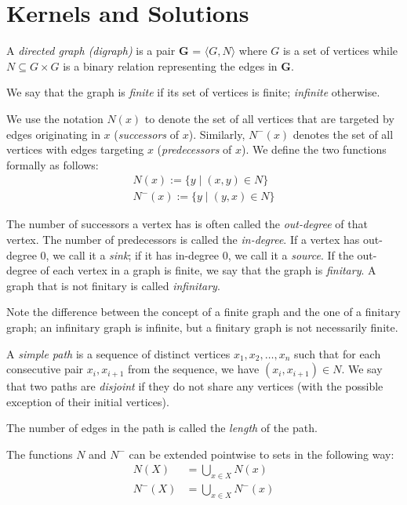 \section{Kernels and Solutions}
\label{sec:Graphs, Kernels and Solutions}
\begin{definition}
  A \textit{directed graph (digraph)} is a pair \textbf{G} = $\langle G,N \rangle$ where $G$ is a set of vertices while $N \subseteq G \times G$ is a binary relation representing the edges in \textbf{G}.
\end{definition}
We say that the graph is \textit{finite} if its set of vertices is finite; \textit{infinite} otherwise.

We use the notation $N(x)$ to denote the set of all vertices that are targeted by edges originating in $x$ (\textit{successors} of $x$).
Similarly, $N^-(x)$ denotes the set of all vertices with edges targeting $x$ (\textit{predecessors} of $x$).
We define the two functions formally as follows:
\begin{align}
  N(x) := \{y \;|\; (x,y) \in N\}\\
  N^-(x) := \{ y \;|\; (y,x) \in N \}
\end{align}
\begin{definition}
  The number of successors a vertex has is often called the \textit{out-degree} of that vertex.
  The number of predecessors is called the \textit{in-degree}.
  If a vertex has out-degree 0, we call it a \textit{sink}; if it has in-degree 0, we call it a \textit{source}.
  If the out-degree of each vertex in a graph is finite, we say that the graph is \textit{finitary}.
  A graph that is not finitary is called \textit{infinitary}.
\end{definition}
Note the difference between the concept of a finite graph and the one of a finitary graph;
an infinitary graph is infinite, but a finitary graph is not necessarily finite.
\begin{definition}
  A \textit{simple path} is a sequence of distinct vertices $x_1,x_2,\dots,x_n$ such that for each consecutive pair $x_i,x_{i+1}$ from the sequence, we have $(x_i, x_{i+1}) \in N$.
  We say that two paths are \textit{disjoint} if they do not share any vertices (with the possible exception of their initial vertices).
\end{definition}
The number of edges in the path is called the \textit{length} of the path.

The functions $N$ and $N^-$ can be extended pointwise to sets in the following way:
\begin{align}
  N(X) &= \bigcup_{x \in X} N(x)\\
  N^-(X) &= \bigcup_{x \in X} N^-(x)
\end{align}

